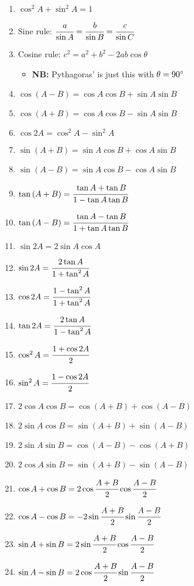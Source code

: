 \documentclass[10pt,a4paper]{article}
\newcommand{\NB}[1]{\textcolor{blumb}{\textbf{NB: }}}
\begin{document}
\begin{enumerate}
    \item $\cos^2{A} + \sin^2{A} = 1$
    \item Sine rule: \quad $\cfrac{a}{\sin{A}}=\cfrac{b}{\sin{B}}=\cfrac{c}{\sin{C}}$
    \item Cosine rule: \quad $c^2=a^2 +b^2 -2ab\cos{\theta}$ \
        \begin{itemize}
            \item \NB{} Pythagoras' is just this with $\theta=90 \degree$
        \end{itemize}
    \item $\cos{(A-B)} = \cos{A}\cos{B} + \sin{A}\sin{B}$
    \item $\cos{(A+B)} = \cos{A}\cos{B} - \sin{A}\sin{B}$
    \item $\cos{2A} = \cos^2{A} - \sin^2{A}$
    \item $\sin{(A+B)} = \sin{A}\cos{B} + \cos{A}\sin{B}$
    \item $\sin{(A-B)} = \sin{A}\cos{B} - \cos{A}\sin{B}$
    \item $\tan{(A+B)} = \cfrac{\tan A + \tan B}{1-\tan A \tan B}$
    \item $\tan{(A-B)} = \cfrac{\tan A - \tan B}{1+\tan A \tan B}$
    \item $\sin{2A} = 2\sin{A}\cos A$
    \item $\sin{2A} = \cfrac{2\tan A}{1+\tan^2A}$
    \item $\cos{2A} = \cfrac{1-\tan^2 A}{1+\tan^2A}$
    \item $\tan{2A} = \cfrac{2\tan A}{1-\tan^2A}$
    \item $\cos^2 A = \cfrac{1+\cos2A}{2}$
    \item $\sin^2 A = \cfrac{1-\cos2A}{2}$
    \item $2\cos A\cos B = \cos(A+B)+\cos(A-B)$
    \item $2\sin A\cos B = \sin(A+B)+\sin(A-B)$
    \item $2\sin A\sin B = \cos(A-B)-\cos(A+B)$
    \item $2\cos A\sin B = \sin(A+B)-\sin(A-B)$
    \item $\cos A + \cos B = 2\cos\cfrac{A+B}{2} \cos\cfrac{A-B}{2}$
    \item $\cos A - \cos B = -2\sin{\cfrac{A+B}{2}} \sin{\cfrac{A-B}{2}}$
    \item $\sin A + \sin B = 2\sin\cfrac{A+B}{2} \cos\cfrac{A-B}{2}$
    \item $\sin A - \sin B = 2\cos\cfrac{A+B}{2} \sin\cfrac{A-B}{2}$
    
\end{enumerate}
\end{document}
